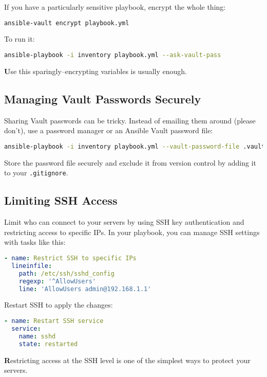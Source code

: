 If you have a particularly sensitive playbook, encrypt the whole thing:
\begin{lstlisting}[language=bash, caption=Encrypting a Playbook]
ansible-vault encrypt playbook.yml
\end{lstlisting}

To run it:
\begin{lstlisting}[language=bash, caption=Running an Encrypted Playbook]
ansible-playbook -i inventory playbook.yml --ask-vault-pass
\end{lstlisting}

\textbf{U}se this sparingly--encrypting variables is usually enough.

\subsection{Managing Vault Passwords Securely}

Sharing Vault passwords can be tricky. Instead of emailing them around (please don't), use a password manager or an Ansible Vault password file:
\begin{lstlisting}[language=bash, caption=Using a Password File]
ansible-playbook -i inventory playbook.yml --vault-password-file .vault_pass
\end{lstlisting}

Store the password file securely and exclude it from version control by adding it to your \texttt{.gitignore}.

\subsection{Limiting SSH Access}

Limit who can connect to your servers by using SSH key authentication and restricting access to specific IPs. In your playbook, you can manage SSH settings with tasks like this:
\begin{lstlisting}[language=yaml, caption=Restricting SSH Access]
- name: Restrict SSH to specific IPs
  lineinfile:
    path: /etc/ssh/sshd_config
    regexp: '^AllowUsers'
    line: 'AllowUsers admin@192.168.1.1'
\end{lstlisting}

Restart SSH to apply the changes:
\begin{lstlisting}[language=yaml]
- name: Restart SSH service
  service:
    name: sshd
    state: restarted
\end{lstlisting}

\textbf{R}estricting access at the SSH level is one of the simplest ways to protect your servers.


